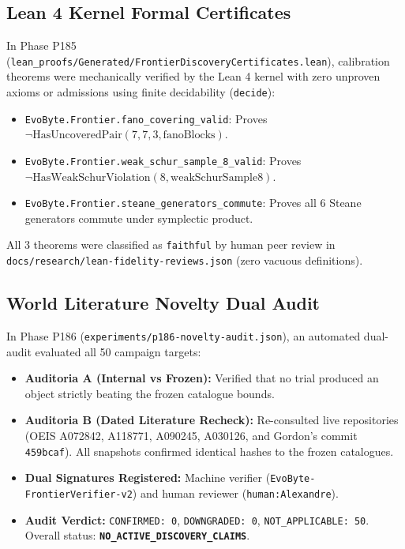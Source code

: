 \documentclass[11pt,a4paper]{article}
\begin{document}
\subsection{Lean 4 Kernel Formal Certificates}
In Phase P185 (\texttt{lean\_proofs/Generated/FrontierDiscoveryCertificates.lean}), calibration theorems were mechanically verified by the Lean 4 kernel with zero unproven axioms or admissions using finite decidability (\texttt{decide}):
\begin{itemize}
    \item \texttt{EvoByte.Frontier.fano\_covering\_valid}: Proves $\neg \text{HasUncoveredPair}(7, 7, 3, \text{fanoBlocks})$.
    \item \texttt{EvoByte.Frontier.weak\_schur\_sample\_8\_valid}: Proves $\neg \text{HasWeakSchurViolation}(8, \text{weakSchurSample8})$.
    \item \texttt{EvoByte.Frontier.steane\_generators\_commute}: Proves all 6 Steane generators commute under symplectic product.
\end{itemize}
All 3 theorems were classified as \texttt{faithful} by human peer review in \texttt{docs/research/lean-fidelity-reviews.json} (zero vacuous definitions).

\subsection{World Literature Novelty Dual Audit}
In Phase P186 (\texttt{experiments/p186-novelty-audit.json}), an automated dual-audit evaluated all 50 campaign targets:
\begin{itemize}
    \item \textbf{Auditoria A (Internal vs Frozen):} Verified that no trial produced an object strictly beating the frozen catalogue bounds.
    \item \textbf{Auditoria B (Dated Literature Recheck):} Re-consulted live repositories (OEIS A072842, A118771, A090245, A030126, and Gordon's commit \texttt{459bcaf}). All snapshots confirmed identical hashes to the frozen catalogues.
    \item \textbf{Dual Signatures Registered:} Machine verifier (\texttt{EvoByte-FrontierVerifier-v2}) and human reviewer (\texttt{human:Alexandre}).
    \item \textbf{Audit Verdict:} \texttt{CONFIRMED: 0}, \texttt{DOWNGRADED: 0}, \texttt{NOT\_APPLICABLE: 50}. Overall status: \textbf{\texttt{NO\_ACTIVE\_DISCOVERY\_CLAIMS}}.
\end{itemize}
\end{document}
